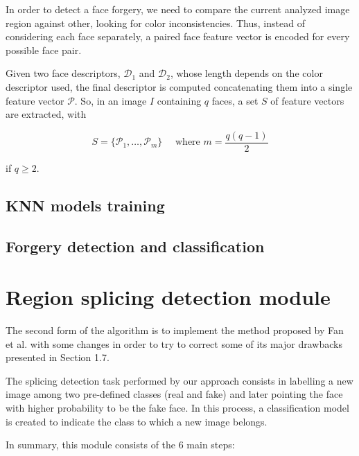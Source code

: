 In order to detect a face forgery, we need to compare  the current analyzed image region against other, looking for color inconsistencies. Thus, instead of considering each face separately, a paired face feature vector is encoded for every possible face pair.

Given two face descriptors, $\mathcal{D_1}$ and $\mathcal{D_2}$, whose length depends on the color descriptor used, the final descriptor is computed concatenating them into a single feature vector $\mathcal{P}$. So, in an image $I$ containing $q$ faces, a set $S$ of feature vectors are extracted, with

$$
S = \{\mathcal{P}_1, \ldots, \mathcal{P}_m\} \quad \textrm{  where } m = \frac{q (q-1)}{2}
$$

if $q \geq 2$. 

\subsection{KNN models training}

\subsection{Forgery detection and classification}


\section{Region splicing detection module}

The second form of the algorithm is to implement the method proposed by Fan et al.\cite{fan2015image} with some changes in order to try to correct some of its major drawbacks presented in Section 1.7.

The splicing detection task performed by our approach consists in labelling a new image among two pre-defined classes (real and fake) and later pointing the face with higher probability to be the fake face. In this process, a classification model is created to indicate the class to which a new image belongs.

In summary, this module consists of the 6 main steps:

